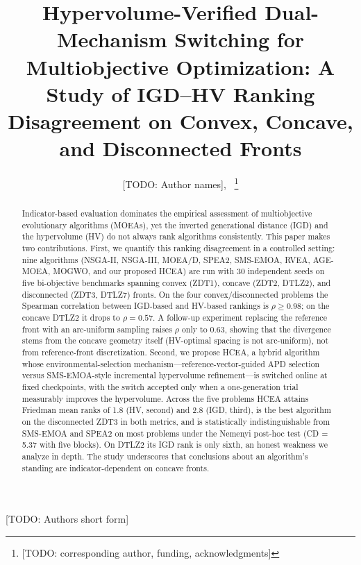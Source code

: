\documentclass[journal]{IEEEtran}
\begin{document}
\title{Hypervolume-Verified Dual-Mechanism Switching for Multiobjective Optimization: A Study of IGD--HV Ranking Disagreement on Convex, Concave, and Disconnected Fronts}

\author{[TODO: Author names],~%
\thanks{[TODO: corresponding author, funding, acknowledgments]}}

{[TODO: Authors short form]}%

\maketitle

\begin{abstract}
Indicator-based evaluation dominates the empirical assessment of multiobjective evolutionary algorithms (MOEAs), yet the inverted generational distance (IGD) and the hypervolume (HV) do not always rank algorithms consistently. This paper makes two contributions. First, we quantify this ranking disagreement in a controlled setting: nine algorithms (NSGA-II, NSGA-III, MOEA/D, SPEA2, SMS-EMOA, RVEA, AGE-MOEA, MOGWO, and our proposed HCEA) are run with 30 independent seeds on five bi-objective benchmarks spanning convex (ZDT1), concave (ZDT2, DTLZ2), and disconnected (ZDT3, DTLZ7) fronts. On the four convex/disconnected problems the Spearman correlation between IGD-based and HV-based rankings is $\rho \geq 0.98$; on the concave DTLZ2 it drops to $\rho = 0.57$. A follow-up experiment replacing the reference front with an arc-uniform sampling raises $\rho$ only to $0.63$, showing that the divergence stems from the concave geometry itself (HV-optimal spacing is not arc-uniform), not from reference-front discretization. Second, we propose HCEA, a hybrid algorithm whose environmental-selection mechanism---reference-vector-guided APD selection versus SMS-EMOA-style incremental hypervolume refinement---is switched online at fixed checkpoints, with the switch accepted only when a one-generation trial measurably improves the hypervolume. Across the five problems HCEA attains Friedman mean ranks of 1.8 (HV, second) and 2.8 (IGD, third), is the best algorithm on the disconnected ZDT3 in both metrics, and is statistically indistinguishable from SMS-EMOA and SPEA2 on most problems under the Nemenyi post-hoc test (CD = 5.37 with five blocks). On DTLZ2 its IGD rank is only sixth, an honest weakness we analyze in depth. The study underscores that conclusions about an algorithm's standing are indicator-dependent on concave fronts.
\end{abstract}
\end{document}
